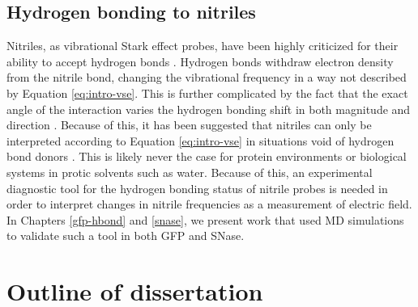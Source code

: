 \subsection{Hydrogen bonding to nitriles} 

Nitriles, as vibrational Stark effect probes, have been highly criticized for their ability to accept hydrogen bonds \cite{Adhikary2014, Adhikary2015}. 
Hydrogen bonds withdraw electron density from the nitrile bond, changing the vibrational frequency in a way not described by Equation \ref{eq:intro-vse}. 
This is further complicated by the fact that the exact angle of the interaction varies the hydrogen bonding shift in both magnitude and direction \cite{Choi2008, First2018}.  
Because of this, it has been suggested that nitriles can only be interpreted according to Equation \ref{eq:intro-vse} in situations void of hydrogen bond donors \cite{Adhikary2014}. 
This is likely never the case for protein environments or biological systems in protic solvents such as water. 
Because of this, an experimental diagnostic tool for the hydrogen bonding status of nitrile probes is needed in order to interpret changes in nitrile frequencies as a measurement of electric field. 
In Chapters \ref{gfp-hbond} and \ref{snase}, we present work that used MD simulations to validate such a tool in both GFP and SNase.  

\section{Outline of dissertation} 

